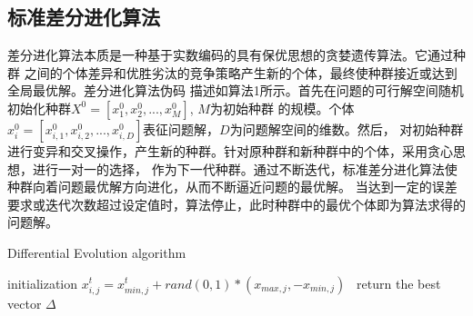\documentclass[a4paper,11pt,onecolumn,twoside]{article}
\begin{document}
\begin{CJK*}{GBK}{song}
\begin{multicols}{2}
\subsection{标准差分进化算法}
\indent 差分进化算法本质是一种基于实数编码的具有保优思想的贪婪遗传算法\supercite{6}。它通过种群
之间的个体差异和优胜劣汰的竞争策略产生新的个体，最终使种群接近或达到全局最优解。差分进化算法伪码
描述如算法1所示。首先在问题的可行解空间随机初始化种群$X^0=[x_1^0,x_2^0,...,x_M^0]$, $M$为初始种群
的规模。个体$x_i^0=[x_{i,1}^0,x_{i,2}^0,...,x_{i,D}^0]$表征问题解，$D$为问题解空间的维数。然后，
对初始种群进行变异和交叉操作，产生新的种群。针对原种群和新种群中的个体，采用贪心思想，进行一对一的选择，
作为下一代种群。通过不断迭代，标准差分进化算法使种群向着问题最优解方向进化，从而不断逼近问题的最优解。
当达到一定的误差要求或迭代次数超过设定值时，算法停止，此时种群中的最优个体即为算法求得的问题解。\\

\begin{algorithm}[H]  
\caption{Differential Evolution algorithm}  
initialization\;
{
	{
		$x_{i,j}^t=x_{min,j}^t+rand(0,1)*(x_{max,j},-x_{min,j})$\
	}
}
return the best vector $\Delta$ \;
\end{algorithm}


\end{multicols}
\end{CJK*}
\end{document}
